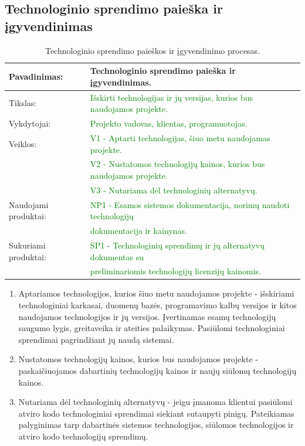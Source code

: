 \documentclass{VUMIFPSkursinis}
\begin{document}
	\subsection{Technologinio sprendimo paieška ir įgyvendinimas}
	\begin{center}
		\begin{table}[ht]
			\caption{Technologinio sprendimo paieškos ir įgyvendinimo procesas.}
			\begin{tabular}{ | l | l | }
				\hline
				Pavadinimas:		& Technologinio sprendimo paieška ir įgyvendinimas.									\\ \hline
				Tikslas:		& \textcolor{green}{Išskirti technologijas ir jų versijas, kurios bus naudojamos projekte. 	}					\\ \hline
				Vykdytojai:		& \textcolor{green}{Projekto vadovas, klientas, programuotojas.}										\\ \hline
				Veiklos:		&\textcolor{green}{V1 - Aptarti technologijas, šiuo metu naudojamas projekte.} 								\\
							& \textcolor{green}{V2 - Nustatomos technologijų kainos, kurios bus naudojamos projekte.}							\\
							& \textcolor{green}{V3 - Nutariama dėl technologinių alternatyvų.	}									\\ \hline
				Naudojami produktai:	& \textcolor{green}{NP1 - Esamos sistemos dokumentacija, norimų naudoti technologijų} \\& \textcolor{green}{dokumentacija ir kainynas. 	}		\\ \hline
				Sukuriami produktai:	& \textcolor{green}{SP1 - Technologinių sprendimų ir jų alternatyvų dokumentas su} \\& \textcolor{green}{preliminariomis technologijų licenzijų kainomis.}	\\ \hline
			\end{tabular}
		\end{table}
	\end{center}
	\newpage
	\begin{enumerate}
		\item{
			Aptariamos technologijos, kurios šiuo metu naudojamos projekte - išskiriami technologiniai karkasai, duomenų bazės, programavimo kalbų versijos ir kitos naudojamos technologijos ir jų versijos.
			Įvertinamas esamų technologijų saugumo lygis, greitaveika ir ateities palaikymas.
			Pasiūlomi technologiniai sprendimai pagrindžiant jų naudą sistemai.
		}
		\item{Nustatomos technologijų kainos, kurios bus naudojamos projekte - paskaičiuojamos dabartinių technologijų kainos ir naujų siūlomų technologijų kainos.}
		\item{
			Nutariama dėl technologinių alternatyvų - jeigu įmanoma klientui pasiūlomi atviro kodo technologiniai sprendimai siekiant sutaupyti pinigų.
			Pateikiamas palyginimas tarp dabartinės sistemos technologijos, siūlomos technologijos ir atviro kodo technologijų sprendimų.
		}
	\end{enumerate}
\end{document}
